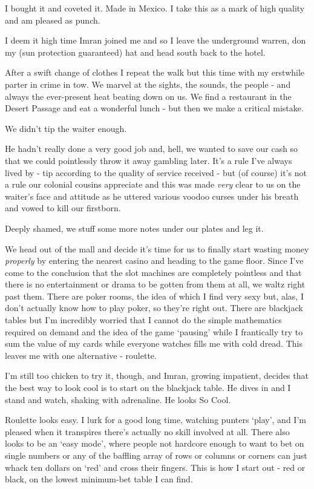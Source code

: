\documentclass[a5paper,titlepage,draft]{book}
\begin{document}
I bought it and coveted it.  Made in Mexico. I take this as a mark of high quality and am pleased as punch.

I deem it high time Imran joined me and so I leave the underground warren, don my (sun protection guaranteed) hat and head south back to the hotel.

After a swift change of clothes I repeat the walk but this time with my erstwhile parter in crime in tow.  We marvel at the sights, the sounds, the people - and always the ever-present heat beating down on us.  We find a restaurant in the Desert Passage and eat a wonderful lunch - but then we make a critical mistake.

We didn't tip the waiter enough.

He hadn't really done a very good job and, hell, we wanted to save our cash so that we could pointlessly throw it away gambling later.  It's a rule I've always lived by - tip according to the quality of service received - but (of course) it's not a rule our colonial cousins appreciate and this was made \emph{very} clear to us on the waiter's face and attitude as he uttered various voodoo curses under his breath and vowed to kill our firstborn.

Deeply shamed, we stuff some more notes under our plates and leg it.

We head out of the mall and decide it's time for us to finally start wasting money \emph{properly} by entering the nearest casino and heading to the game floor.  Since I've come to the conclusion that the slot machines are completely pointless and that there is no entertainment or drama to be gotten from them at all, we waltz right past them.  There are poker rooms, the idea of which I find very sexy but, alas, I don't actually know how to play poker, so they're right out.  There are blackjack tables but I'm incredibly worried that I cannot do the simple mathematics required on demand and the idea of the game `pausing' while I frantically try to sum the value of my cards while everyone watches fills me with cold dread.  This leaves me with one alternative - roulette. 

I'm still too chicken to try it, though, and Imran, growing impatient, decides that the best way to look cool is to start on the blackjack table.  He dives in and I stand and watch, shaking with adrenaline.  He looks So Cool.

Roulette looks easy.  I lurk for a good long time, watching punters `play', and I'm pleased when it transpires there's actually no skill involved at all.  There also looks to be an `easy mode', where people not hardcore enough to want to bet on single numbers or any of the baffling array of rows or columns or corners can just whack ten dollars on `red' and cross their fingers.  This is how I start out - red or black, on the lowest minimum-bet table I can find.
\end{document}
